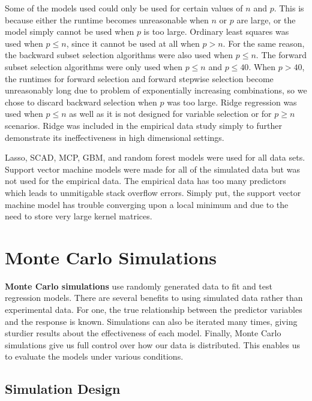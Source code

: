 \documentclass{article}
\begin{document}
	Some of the models used could only be used for certain values of $n$ and $p$. This is because either the runtime becomes unreasonable when $n$ or $p$ are large, or the model simply cannot be used when $p$ is too large. Ordinary least squares was used when $p\leq n$, since it cannot be used at all when $p>n$. For the same reason, the backward subset selection algorithms were also used when $p\leq n$. The forward subset selection algorithms were only used when $p\leq n$ and $p\leq 40$. When $p>40$, the runtimes for forward selection and forward stepwise selection become unreasonably long due to problem of exponentially increasing combinations, so we chose to discard backward selection when $p$ was too large. Ridge regression was used when $p\leq n$ as well as it is not designed for variable selection or for $p \geq n$ scenarios. Ridge was included in the empirical data study simply to further demonstrate its ineffectiveness in high dimensional settings.
	
	Lasso, SCAD, MCP, GBM, and random forest models were used for all data sets. Support vector machine models were made for all of the simulated data but was not used for the empirical data. The empirical data has too many predictors which leads to unmitigable stack overflow errors. Simply put, the support vector machine model has trouble converging upon a local minimum and due to the need to store very large kernel matrices.
	
	\section{Monte Carlo Simulations}\label{sec:simulations}
	
	\textbf{Monte Carlo simulations} use randomly generated data to fit and test regression  models. There are several benefits to using simulated data rather than experimental data. For one, the true relationship between the predictor variables and the response is known. Simulations can also be iterated many times, giving sturdier results about the effectiveness of each model. Finally, Monte Carlo simulations give us full control over how our data is distributed. This enables us to evaluate the models under various conditions.
	
	
	\subsection{Simulation Design}
	
\end{document}

